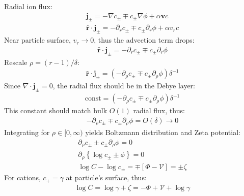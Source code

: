 Radial ion flux: 
\begin{eqnarray}
\mathbf j_\pm= -\nabla c_\pm \mp c_\pm \nabla \phi + \alpha \mathbf{v}c
\\
\hat{\mathbf{r}}\cdot\mathbf j_\pm= -\partial_r c_\pm \mp c_\pm \partial_r \phi + \alpha v_r c
\end{eqnarray}
Near particle surface, $v_r \rightarrow 0$, thus the advection term drops:
\begin{eqnarray}
\hat{\mathbf{r}}\cdot\mathbf j_\pm= -\partial_r c_\pm \mp c_\pm \partial_r \phi 
\end{eqnarray}
Rescale $\rho = (r-1)/\delta$:
\begin{eqnarray}
\hat{\mathbf{r}}\cdot\mathbf j_\pm = \left(-\partial_\rho c_\pm \mp c_\pm \partial_\rho \phi \right) \delta^{-1}
\end{eqnarray}
Since $\nabla \cdot \mathbf j_\pm = 0$, the radial flux should be in the Debye layer:
\begin{eqnarray}
\mbox{const} = \left(-\partial_\rho c_\pm \mp c_\pm \partial_\rho \phi \right) \delta^{-1}
\end{eqnarray}
This constant should match bulk $O(1)$ radial flux, thus:
\begin{eqnarray}
-\partial_\rho c_\pm \mp c_\pm \partial_\rho \phi = O(\delta) \rightarrow 0
\end{eqnarray}
Integrating for $\rho \in [0,\infty)$ yields Boltzmann distribution and 
Zeta potential:
\begin{eqnarray}
\partial_\rho c_\pm \pm c_\pm \partial_\rho \phi = 0
\\
\partial_\rho \left\{ \log c_\pm \pm \phi \right\}= 0
\\
\log C - \log c_\pm = \mp[\varPhi - \mathcal V] = \pm \zeta
\end{eqnarray}
For cations, $c_+ = \gamma$ at particle's surface, thus:
\begin{eqnarray}
\log C = \log \gamma + \zeta = -\varPhi + \mathcal V + \log \gamma
\end{eqnarray}
